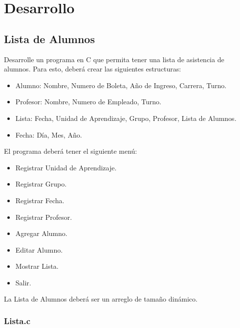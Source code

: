 \documentclass{article}
\begin{document}
	\newpage
	
	\section{Desarrollo}
	
	\subsection{Lista de Alumnos}
	
	Desarrolle un programa en C que permita tener una lista de asistencia de alumnos.
	Para esto, deberá crear las siguientes estructuras:
	
	\begin{itemize}
		\item Alumno: Nombre, Numero de Boleta, Año de Ingreso, Carrera, Turno.
		\item Profesor: Nombre, Numero de Empleado, Turno.
		\item Lista: Fecha, Unidad de Aprendizaje, Grupo, Profesor, Lista de Alumnos.
		\item Fecha: Día, Mes, Año.
	\end{itemize}
	
	El programa deberá tener el siguiente menú:
	
	\begin{itemize}
		\item Registrar Unidad de Aprendizaje.
		\item Registrar Grupo.
		\item Registrar Fecha.
		\item Registrar Profesor.
		\item Agregar Alumno.
		\item Editar Alumno.
		\item Mostrar Lista.
		\item Salir.
	\end{itemize}
	
	La Lista de Alumnos deberá ser un arreglo de tamaño dinámico.
	
	\newpage
	
	\subsubsection{Lista.c}
	
\end{document}
